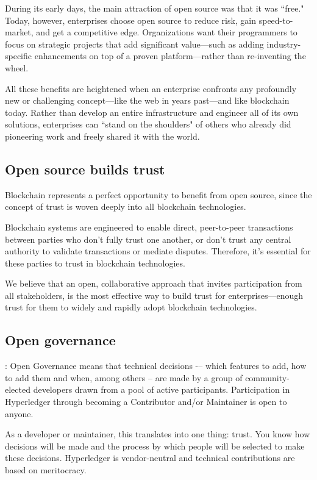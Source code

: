 During its early days, the main attraction of open source was that it was ``free." 
Today, however, enterprises choose open source to reduce risk, gain speed-to-market, and get a competitive edge. 
Organizations want their programmers to focus on strategic projects that add significant value---such as adding industry-specific enhancements on top of a proven platform---rather than re-inventing the wheel. 

All these benefits are heightened when an enterprise confronts any profoundly new or challenging concept---like the web in years past---and like blockchain today. 
Rather than develop an entire infrastructure and engineer all of its own solutions, enterprises can ``stand on the shoulders" of others who already did pioneering work and freely shared it with the world. 

\subsection{Open source builds trust}
Blockchain represents a perfect opportunity to benefit from open source, since the concept of trust is woven deeply into all blockchain technologies. 

Blockchain systems are engineered to enable direct, peer-to-peer transactions between parties who don't fully trust one another, or don't trust any central authority to validate transactions or mediate disputes. 
Therefore, it's essential for these parties to trust in blockchain technologies. 

We believe that an open, collaborative approach that invites participation from all stakeholders, is the most effective way to build trust for enterprises---enough trust for them to widely and rapidly adopt blockchain technologies. 

\subsection{Open governance}: 
Open Governance means that technical decisions -– which features to add, how to add them and when, among others – are made by a group of community-elected developers drawn from a pool of active participants. Participation in Hyperledger through becoming a Contributor and/or Maintainer is open to anyone.

As a developer or maintainer, this translates into one thing: trust. You know how decisions will be made and the process by which people will be selected to make these decisions. Hyperledger is vendor-neutral and technical contributions are based on meritocracy. 

